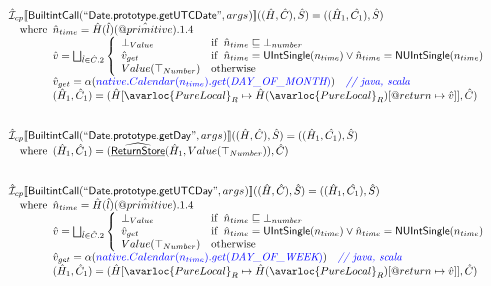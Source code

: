 \[\begin{array}{l}
\aI _{cp}\lbr \SF{BuiltintCall}(``\SF{Date.prototype.getUTCDate}",args_{})\rbr((\hat{H},\hat{C}), \hat{S})
  = ((\hat{H}_1, \hat{C_1}), \hat{S})\\
\quad\wherec{
  \hat{n}_{time} = \hat{H}(\hat{l})(\avarprop{primitive}).1.4\\
  \hat{v} = \bigsqcup_{\hat{l} \in \hat{C}.2} \left\{\begin{array}{ll}
      \bot_{Value} & \ifc{\hat{n}_{time} \sqsubseteq  \bot_{number}}\\
      \hat{v}_{get} &
      \ifc{\hat{n}_{time} = \SF{UIntSingle}(n_{time}) \lor\hat{n}_{time} = \SF{NUIntSingle}(n_{time}) }\\
      Value(\top_{Number}) & \owc
    \end{array}\right.\\
  \hat{v}_{get} = \alpha({\inblue native.Calendar(n_{time}).get(\emph{DAY\_OF\_MONTH})})
    \quad\comment{{\inblue // java, scala}}\\  
  (\hat{H}_1, \hat{C}_1) = 
    (\hat{H}[\avarloc{PureLocal}_R \mapsto \hat{H}(\avarloc{PureLocal}_R)
      [\varprop{return} \mapsto \hat{v}]], \hat{C})\\
  }\\
\\\\

\aI _{cp}\lbr \SF{BuiltintCall}(``\SF{Date.prototype.getDay}",args_{})\rbr((\hat{H},\hat{C}), \hat{S})
  = ((\hat{H}_1, \hat{C_1}), \hat{S})\\
\quad\wherec{
  (\hat{H}_1, \hat{C}_1) = (\ahf{ReturnStore}(\hat{H}_1, Value(\top_{Number})), \hat{C})
  }\\
\\\\

\aI _{cp}\lbr \SF{BuiltintCall}(``\SF{Date.prototype.getUTCDay}",args_{})\rbr((\hat{H},\hat{C}), \hat{S})
  = ((\hat{H}_1, \hat{C_1}), \hat{S})\\
\quad\wherec{
  \hat{n}_{time} = \hat{H}(\hat{l})(\avarprop{primitive}).1.4\\
  \hat{v} = \bigsqcup_{\hat{l} \in \hat{C}.2} \left\{\begin{array}{ll}
      \bot_{Value} & \ifc{\hat{n}_{time} \sqsubseteq  \bot_{number}}\\
      \hat{v}_{get} &
      \ifc{\hat{n}_{time} = \SF{UIntSingle}(n_{time}) \lor\hat{n}_{time} = \SF{NUIntSingle}(n_{time}) }\\
      Value(\top_{Number}) & \owc
    \end{array}\right.\\
  \hat{v}_{get} = \alpha({\inblue native.Calendar(n_{time}).get(\emph{DAY\_OF\_WEEK})})
    \quad\comment{{\inblue // java, scala}}\\  
  (\hat{H}_1, \hat{C}_1) = 
    (\hat{H}[\avarloc{PureLocal}_R \mapsto \hat{H}(\avarloc{PureLocal}_R)
      [\varprop{return} \mapsto \hat{v}]], \hat{C})\\
  }\\
\\\\

\end{array}
\]
